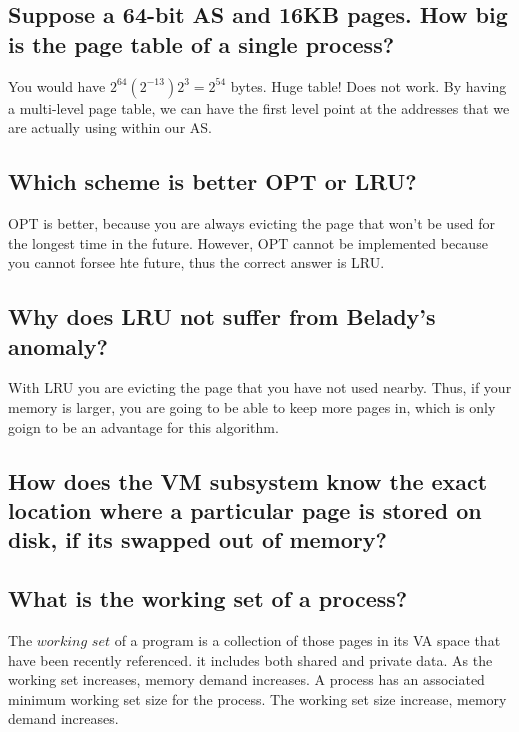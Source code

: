 \documentclass[a4paper]{article}
\begin{document}
\subsection{Suppose a 64-bit AS and 16KB pages. How big is the page table of a single process?} %
\label{sub:Suppose a 64-bit AS and 16KB pages. How big is the page table of a single process?}
You would have $2^64 ( 2^{-13})2^3=2^{54}$ bytes. Huge table! Does not work. By having a multi-level page table,
we can have the first level point at the addresses that we are actually using within our AS.
\subsection{Which scheme is better OPT or LRU?} %
\label{sub:Which scheme is better OPT or LRU?}
OPT is better, because you are always evicting the page that won't be used for the longest time in the future. However,
OPT cannot be implemented because you cannot forsee hte future, thus the correct answer is LRU.
\subsection{Why does LRU not suffer from Belady's anomaly?} %
\label{sub:Why does LRU not suffer from Belady's anomaly?}
With LRU you are evicting the page that you have not used nearby. Thus, if your memory is larger, you are going to be able to
keep more pages in, which is only goign to be an advantage for this algorithm.
\subsection{How does the VM subsystem know the exact location where a particular page is stored on disk, if its swapped out of memory?} %
\label{sub:How does the VM subsystem know the exact location where a particular page is stored on disk, if its swapped out of memory?}

\subsection{What is the working set of a process?} %
\label{sub:What is the working set of a process?}
The $working$ $set$ of a program is a collection of those pages in its VA space that have been recently referenced. it includes both shared and private data. As the working set increases, memory demand increases. A process has an associated minimum working set
size for the process. The working set size increase, memory demand increases. 
\end{document}
